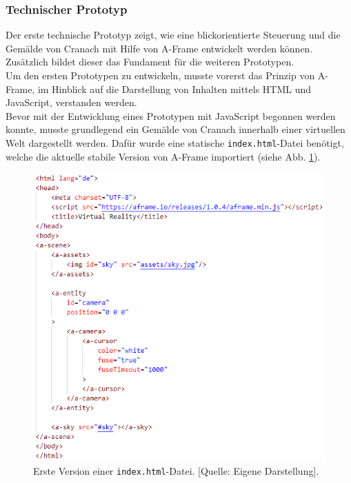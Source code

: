 \documentclass[a4paper,12pt,oneside]{article}
\begin{document}
      \subsubsection{Technischer Prototyp}
        Der erste technische Prototyp zeigt, wie eine blickorientierte
        Steuerung und die Gemälde von Cranach mit Hilfe von A-Frame 
        entwickelt werden können. Zusätzlich bildet dieser das Fundament 
        für die weiteren Prototypen. \\
        Um den ersten Prototypen zu entwickeln, musste vorerst das Prinzip
        von A-Frame, im Hinblick auf die Darstellung von Inhalten mittels HTML
        und JavaScript, verstanden werden. \\
        Bevor mit der Entwicklung eines Prototypen mit JavaScript begonnen
        werden konnte, musste grundlegend ein Gemälde von Cranach innerhalb
        einer virtuellen Welt dargestellt werden. Dafür wurde eine statische
        \texttt{index.html}-Datei benötigt, welche die aktuelle stabile 
        Version von A-Frame importiert (siehe Abb. \ref{fig:index1}).
        \begin{figure}
          \centering
          \includegraphics[scale=0.9]{img/coding/index1.png}
          \caption[Erste Version einer \texttt{index.html}-Datei.]{Erste Version einer \texttt{index.html}-Datei. [Quelle: Eigene Darstellung].}
          \label{fig:index1}
        \end{figure}
\end{document}
